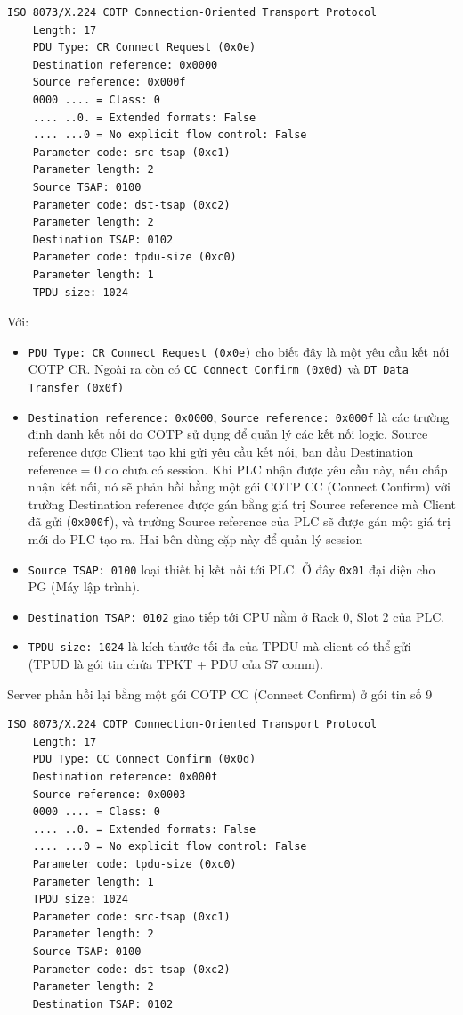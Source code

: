 \documentclass[../main.tex]{subfiles}
\begin{document}
\begin{verbatim}
ISO 8073/X.224 COTP Connection-Oriented Transport Protocol
    Length: 17
    PDU Type: CR Connect Request (0x0e)
    Destination reference: 0x0000
    Source reference: 0x000f
    0000 .... = Class: 0
    .... ..0. = Extended formats: False
    .... ...0 = No explicit flow control: False
    Parameter code: src-tsap (0xc1)
    Parameter length: 2
    Source TSAP: 0100
    Parameter code: dst-tsap (0xc2)
    Parameter length: 2
    Destination TSAP: 0102
    Parameter code: tpdu-size (0xc0)
    Parameter length: 1
    TPDU size: 1024
\end{verbatim}

Với:

\begin{itemize}
    \item \texttt{PDU Type: CR Connect Request (0x0e)} cho biết đây là một yêu cầu kết nối COTP CR. Ngoài ra còn có \texttt{CC Connect Confirm (0x0d)} và \texttt{DT Data Transfer (0x0f)}

    \item \texttt{Destination reference: 0x0000}, \texttt{Source reference: 0x000f} là các trường định danh kết nối do COTP sử dụng để quản lý các kết nối logic. Source reference được Client tạo khi gửi yêu cầu kết nối, ban đầu Destination reference = 0 do chưa có session. Khi PLC nhận được yêu cầu này, nếu chấp nhận kết nối, nó sẽ phản hồi bằng một gói COTP CC (Connect Confirm) với trường Destination reference được gán bằng giá trị Source reference mà Client đã gửi (\texttt{0x000f}), và trường Source reference của PLC sẽ được gán một giá trị mới do PLC tạo ra. Hai bên dùng cặp này để quản lý session

    \item \texttt{Source TSAP: 0100} loại thiết bị kết nối tới PLC. Ở đây \texttt{0x01} đại diện cho PG (Máy lập trình).

    \item \texttt{Destination TSAP: 0102} giao tiếp tới CPU nằm ở Rack 0, Slot 2 của PLC.

    \item \texttt{TPDU size: 1024} là kích thước tối đa của TPDU mà client có thể gửi (TPUD là gói tin chứa TPKT + PDU của S7 comm).
\end{itemize}

Server phản hồi lại bằng một gói COTP CC (Connect Confirm) ở gói tin số 9

\begin{verbatim}
ISO 8073/X.224 COTP Connection-Oriented Transport Protocol
    Length: 17
    PDU Type: CC Connect Confirm (0x0d)
    Destination reference: 0x000f
    Source reference: 0x0003
    0000 .... = Class: 0
    .... ..0. = Extended formats: False
    .... ...0 = No explicit flow control: False
    Parameter code: tpdu-size (0xc0)
    Parameter length: 1
    TPDU size: 1024
    Parameter code: src-tsap (0xc1)
    Parameter length: 2
    Source TSAP: 0100
    Parameter code: dst-tsap (0xc2)
    Parameter length: 2
    Destination TSAP: 0102
\end{verbatim}
\end{document}
